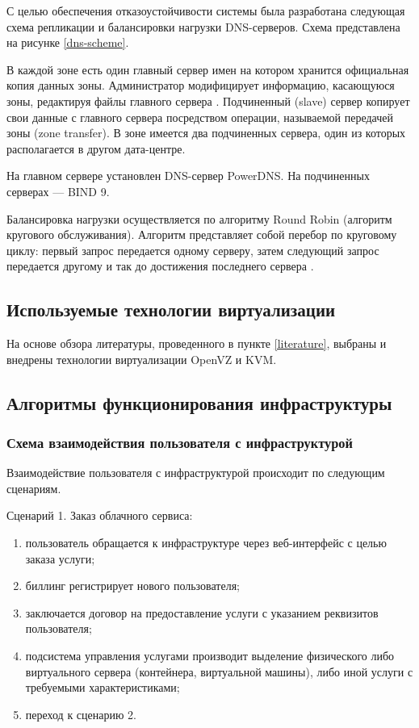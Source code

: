 С целью обеспечения отказоустойчивости системы была разработана следующая схема репликации и балансировки нагрузки DNS-серверов.
Схема представлена на рисунке \ref{dns-scheme}.

В каждой зоне есть один главный сервер имен на котором хранится официальная копия данных зоны.
Администратор модифицирует информацию, касающуюся зоны, редактируя файлы главного сервера \cite{unix-handbook}.
Подчиненный (slave) сервер копирует свои данные с главного сервера посредством операции, называемой передачей зоны (zone transfer).
В зоне имеется два подчиненных сервера, один из которых располагается в другом дата-центре.

На главном сервере установлен DNS-сервер PowerDNS.
На подчиненных серверах --- BIND 9.

Балансировка нагрузки осуществляется по алгоритму Round Robin (алгоритм кругового обслуживания).
Алгоритм представляет собой перебор по круговому циклу: первый запрос передается одному серверу, затем следующий запрос передается другому и так до достижения последнего сервера \cite{selectel}.

\subsection{Используемые технологии виртуализации}

На основе обзора литературы, проведенного в пункте \ref{literature}, выбраны и внедрены технологии виртуализации OpenVZ и KVM.

\subsection{Алгоритмы функционирования инфраструктуры}

\subsubsection{Схема взаимодействия пользователя с инфраструктурой}

Взаимодействие пользователя с инфраструктурой происходит по следующим сценариям.

Сценарий 1. Заказ облачного сервиса:
\begin{enumerate}
  \item пользователь обращается к инфраструктуре через веб-интерфейс с целью заказа услуги;
  \item биллинг регистрирует нового пользователя;
  \item заключается договор на предоставление услуги с указанием реквизитов пользователя;
  \item подсистема управления услугами производит выделение физического либо виртуального сервера (контейнера, виртуальной машины), либо иной услуги с требуемыми характеристиками;
  \item переход к сценарию 2.
\end{enumerate}

